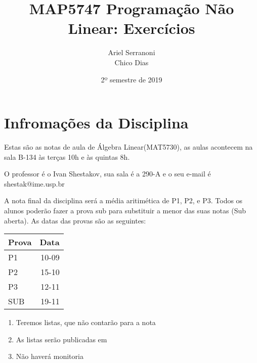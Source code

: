 \documentclass[12pt,twoside,a4paper]{book}
\title{MAP5747 Programação Não Linear: Exercícios}
\author{Ariel Serranoni \\
        Chico Dias}
\date{2º semestre de 2019}
\begin{document}
\maketitle
\newpage
\tableofcontents
\newpage
\chapter*{Infromações da Disciplina}
\label{sec:intro}
\label{new-question}

Estas são as notas de aula de Álgebra Linear(MAT5730), as aulas acontecem na sala B-134 às terças 10h e às quintas 8h.



O professor é o Ivan Shestakov, sua sala é a 290-A e o seu e-mail é shestak@ime.usp.br

\nocite{*}



A nota final da disciplina será a média aritimética de P1, P2, e P3. Todos os
alunos poderão fazer a prova sub para substituir a menor das suas notas (Sub
aberta). As datas das provas são as seguintes:

\begin{table}[h!]
  \begin{center}
    
    \label{tab:table1}
    \begin{tabular}{l|r} 
     \textbf{Prova} & \textbf{Data}\\
      \hline
      P1 & 10-09\\
      P2 & 15-10\\
      P3 & 12-11\\
      SUB & 19-11
    \end{tabular}
  \end{center}
\end{table}
\begin{enumerate}[label=(\roman*)]
\item Teremos listas, que não contarão para a nota
\item As listas serão publicadas em 
\item Não haverá monitoria
\end{enumerate}
\newpage 
\end{document}
